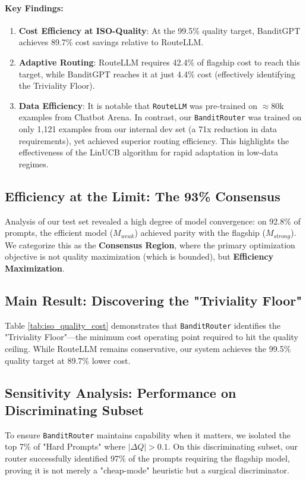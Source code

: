 \paragraph{Key Findings:}
\begin{enumerate}
    \item \textbf{Cost Efficiency at ISO-Quality}: At the 99.5\% quality target, BanditGPT achieves 89.7\% cost savings relative to RouteLLM.
    
    \item \textbf{Adaptive Routing}: RouteLLM requires 42.4\% of flagship cost to reach this target, while BanditGPT reaches it at just 4.4\% cost (effectively identifying the Triviality Floor).
    
    \item \textbf{Data Efficiency}: It is notable that \texttt{RouteLLM} was pre-trained on $\approx$80k examples from Chatbot Arena. In contrast, our \texttt{BanditRouter} was trained on only 1,121 examples from our internal dev set (a 71x reduction in data requirements), yet achieved superior routing efficiency. This highlights the effectiveness of the LinUCB algorithm for rapid adaptation in low-data regimes.
\end{enumerate}

\subsection{Efficiency at the Limit: The 93\% Consensus}

Analysis of our test set revealed a high degree of model convergence: on 92.8\% of prompts, the efficient model ($M_{weak}$) achieved parity with the flagship ($M_{strong}$). We categorize this as the \textbf{Consensus Region}, where the primary optimization objective is not quality maximization (which is bounded), but \textbf{Efficiency Maximization}.

\subsection{Main Result: Discovering the "Triviality Floor"}

Table \ref{tab:iso_quality_cost} demonstrates that \texttt{BanditRouter} identifies the "Triviality Floor"—the minimum cost operating point required to hit the quality ceiling. While RouteLLM remains conservative, our system achieves the 99.5\% quality target at 89.7\% lower cost.

\subsection{Sensitivity Analysis: Performance on Discriminating Subset}

To ensure \texttt{BanditRouter} maintains capability when it matters, we isolated the top 7\% of "Hard Prompts" where $|\Delta Q| > 0.1$. On this discriminating subset, our router successfully identified 97\% of the prompts requiring the flagship model, proving it is not merely a "cheap-mode" heuristic but a surgical discriminator.

